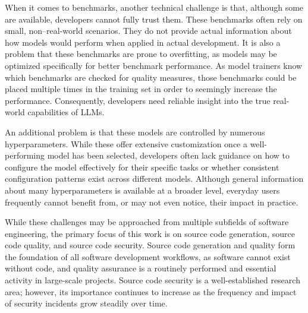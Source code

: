 When it comes to benchmarks, another technical challenge is that, although some are available, developers cannot fully trust them.
These benchmarks often rely on small, non–real-world scenarios.
They do not provide actual information about how models would perform when applied in actual development.
It is also a problem that these benchmarks are prone to overfitting, as models may be optimized specifically for better benchmark performance.
As model trainers know which benchmarks are checked for quality measures, those benchmarks could be placed multiple times in the training set in order to seemingly increase the performance.
Consequently, developers need reliable insight into the true real-world capabilities of LLMs.

An additional problem is that these models are controlled by numerous hyperparameters.
While these offer extensive customization once a well-performing model has been selected, developers often lack guidance on how to configure the model effectively for their specific tasks or whether consistent configuration patterns exist across different models.
Although general information about many hyperparameters is available at a broader level, everyday users frequently cannot benefit from, or may not even notice, their impact in practice.


While these challenges may be approached from multiple subfields of software engineering, the primary focus of this work is on source code generation, source code quality, and source code security.
Source code generation and quality form the foundation of all software development workflows, as software cannot exist without code, and quality assurance is a routinely performed and essential activity in large-scale projects.
Source code security is a well-established research area; however, its importance continues to increase as the frequency and impact of security incidents grow steadily over time.

